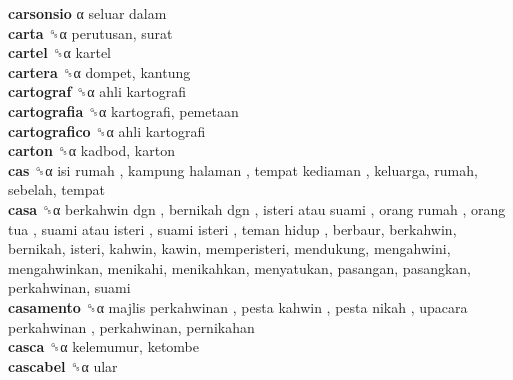 \textbf{carsonsio} α   seluar dalam   \\
\textbf{carta} ␝α  perutusan, surat  \\
\textbf{cartel} ␝α  kartel  \\
\textbf{cartera} ␝α  dompet, kantung  \\
\textbf{cartograf} ␝α   ahli kartografi   \\
\textbf{cartografia} ␝α  kartografi, pemetaan  \\
\textbf{cartografico} ␝α   ahli kartografi   \\
\textbf{carton} ␝α  kadbod, karton  \\
\textbf{cas} ␝α   isi rumah ,  kampung halaman ,  tempat kediaman , keluarga, rumah, sebelah, tempat  \\
\textbf{casa} ␝α   berkahwin dgn ,  bernikah dgn ,  isteri atau suami ,  orang rumah ,  orang tua ,  suami atau isteri ,  suami isteri ,  teman hidup , berbaur, berkahwin, bernikah, isteri, kahwin, kawin, memperisteri, mendukung, mengahwini, mengahwinkan, menikahi, menikahkan, menyatukan, pasangan, pasangkan, perkahwinan, suami  \\
\textbf{casamento} ␝α   majlis perkahwinan ,  pesta kahwin ,  pesta nikah ,  upacara perkahwinan , perkahwinan, pernikahan  \\
\textbf{casca} ␝α  kelemumur, ketombe  \\
\textbf{cascabel} ␝α  ular  \\
